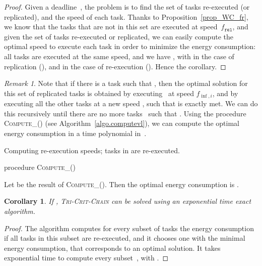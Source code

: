 \documentclass[a4paper]{article}
\theoremstyle{plain}
\newtheorem{corollary}{Corollary}
\theoremstyle{definition}
\theoremstyle{remark}
\newtheorem*{remark}{Remark}
\newcommand{\finf}{\ensuremath{f_{\inf,i}}\xspace}
\newcommand{\fr}{\ensuremath{f_{\texttt{rel}}}\xspace}
\newcommand{\computeVl}{\textsc{Compute\_}}
\newcommand{\chain}{\textsc{Tri-Crit-Chain}\xspace}
\begin{document}
\begin{proof}
  Given a deadline~, the problem is to find the set of tasks
  re-executed (or replicated), and the speed of each task. Thanks to
  Proposition~\ref{prop_WC_fr}, we know that the tasks that are not in
  this set are executed at speed~\fr, and given the set of tasks
  re-executed or replicated, we can easily compute the optimal speed
  to execute each task in order to minimize the energy consumption:
  all tasks are executed at the same speed, and we have
  , with 
  in the case of replication (), and  in the case
  of re-execution (). 
  Hence the corollary.
\end{proof}

\begin{remark}
  Note that if there is a task  such that , then the optimal solution for this set of replicated tasks
  is obtained by executing~ at speed \finf, and by executing all
  the other tasks at a new speed ,
  such that  is exactly met.  We can do this recursively until
  there are no more tasks~ such that . Using the procedure \computeVl() (see
  Algorithm~\ref{algo.computevl}), we can
  compute the optimal energy consumption in a time polynomial
  in~. 

\begin{algorithm}[htb]
\caption{Computing re-execution speeds; tasks in  are
  re-executed.}
\label{algo.computevl}
procedure {\computeVl}()\\
\end{algorithm}

Let  be the result of \computeVl(). Then the optimal
energy consumption is
 .



\end{remark}



\begin{corollary}
If , \chain can be solved using an exponential time 
exact algorithm.
\end{corollary}

\begin{proof}
  The algorithm computes for every subset  of tasks the energy
  consumption if all tasks in this subset are re-executed, and it
  chooses one with the minimal energy consumption, that corresponds to
  an optimal solution. It takes exponential time to compute every
  subset~, with . 
\end{proof}
\end{document}

